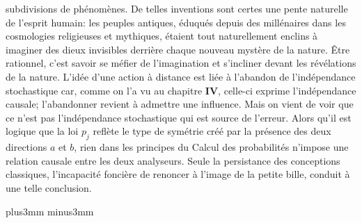 subdivisions de ph\'enom\`enes.  De telles inventions sont certes une pente
naturelle de l'esprit humain:  les peuples antiques,  \'eduqu\'es depuis des
mill\'enaires dans les cosmologies religieuses et mythiques,  \'etaient tout
naturellement enclins \`a imaginer des dieux invisibles derri\`ere chaque
nouveau myst\`ere de la nature.  \^Etre rationnel,  c'est savoir se m\'efier
de l'imagination et s'incliner devant les r\'ev\'elations de la nature. 
\medskip 
L'id\'ee d'une action \`a distance est li\'ee \`a l'abandon de  
l'ind\'ependance stochastique car,  comme on l'a vu au chapitre {\bf IV}, 
celle-ci exprime l'ind\'e\-pen\-dance causale;  l'abandonner revient \`a 
admettre une influence.  Mais on vient de voir que ce n'est pas 
l'ind\'ependance stochastique  qui est source de l'erreur.  Alors qu'il est 
logique que la loi $p_j$ refl\`ete le type de sym\'etrie cr\'e\'e par la 
pr\'esence des deux directions $a$ et $b$,  rien dans les principes du 
Calcul des probabilit\'es n'impose une relation causale entre les deux 
analyseurs.  Seule la persistance des conceptions classiques, 
l'incapacit\'e fonci\`ere de renoncer \`a l'image de la petite bille,  
conduit \`a une telle conclusion. 

\vskip6mm plus3mm minus3mm

